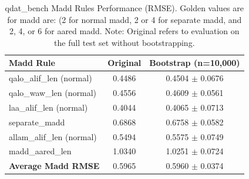 \begin{table}[t]
	\centering
	\begin{tabular}{lcc}
		\hline
		\textbf{Madd Rule}         & \textbf{Original} & \textbf{Bootstrap (n=10,000)} \\
		\hline
		qalo\_alif\_len (normal)   & 0.4486            & 0.4504 $\pm$ 0.0676           \\
		qalo\_waw\_len (normal)    & 0.4556            & 0.4609 $\pm$ 0.0561           \\
		laa\_alif\_len (normal)    & 0.4044            & 0.4065 $\pm$ 0.0713           \\
		separate\_madd             & 0.6868            & 0.6758 $\pm$ 0.0582           \\
		allam\_alif\_len (normal)  & 0.5494            & 0.5575 $\pm$ 0.0749           \\
		madd\_aared\_len           & 1.0340            & 1.0251 $\pm$ 0.0724           \\
		\hline
		\textbf{Average Madd RMSE} & 0.5965            & 0.5960 $\pm$ 0.0374           \\
		\hline
	\end{tabular}
	\caption{qdat\_bench Madd Rules Performance (RMSE). Golden values are for madd are: (2 for normal madd, 2 or 4 for separate madd, and 2, 4, or 6 for aared madd. Note: Original refers to evaluation on the full test set without bootstrapping.}
	\label{tab:qdat_madd_metrics}
\end{table}

